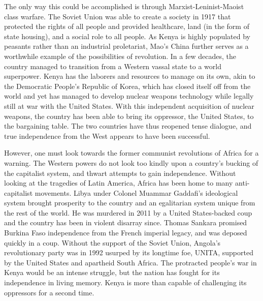 \documentclass[american]{../../../coursework}
\begin{document}
The only way this could be accomplished is through Marxist-Leninist-Maoist
class warfare. The Soviet Union was able to create a society in 1917 that
protected the rights of all people and provided healthcare, land (in the form
of state housing), and a social role to all people. As Kenya is highly
populated by peasants rather than an industrial proletariat, Mao's China
further serves as a worthwhile example of the possibilities of revolution. In
a few decades, the country managed to transition from a Western vassal state
to a world superpower. Kenya has the laborers and resources to manage on its
own, akin to the Democratic People's Republic of Korea, which has closed
itself off from the world and yet has managed to develop nuclear weapons
technology while legally still at war with the United States. With this
independent acquisition of nuclear weapons, the country has been able to bring
its oppressor, the United States, to the bargaining table. The two countries
have thus reopened tense dialogue, and true independence from the West appears
to have been successful.

However, one must look towards the former communist revolutions of Africa for
a warning. The Western powers do not look too kindly upon a country's bucking
of the capitalist system, and thwart attempts to gain independence. Without
looking at the tragedies of Latin America, Africa has been home to many
anti-capitalist movements. Libya under Colonel Muammar Gaddafi's ideological
system brought prosperity to the country and an egalitarian system unique from
the rest of the world. He was murdered in 2011 by a United States-backed coup
and the country has been in violent disarray since. Thomas Sankara promised
Burkina Faso independence from the French imperial legacy, and was deposed
quickly in a coup. Without the support of the Soviet Union, Angola's
revolutionary party was in 1992 usurped by its longtime foe, UNITA, supported
by the United States and apartheid South Africa. The protracted people's war
in Kenya would be an intense struggle, but the nation has fought for its
independence in living memory. Kenya is more than capable of challenging its
oppressors for a second time.

\printbibliography
\end{document}
